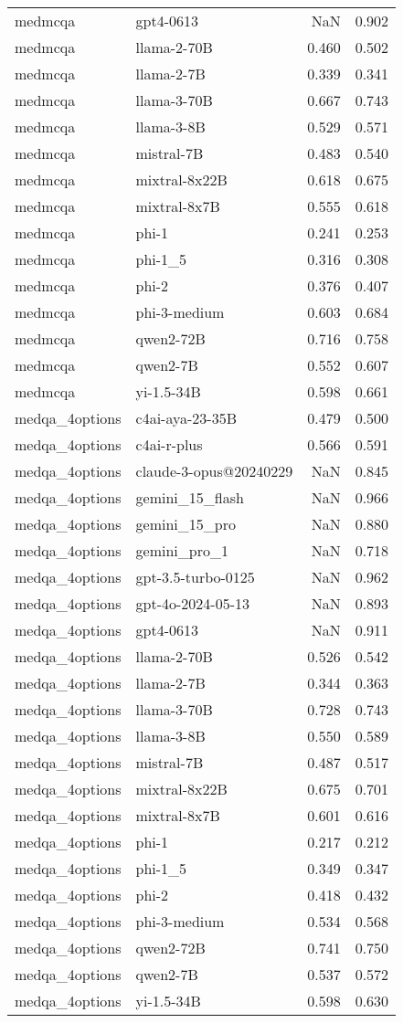 \begin{tabular}{llrr}
medmcqa & gpt4-0613 & NaN & 0.902 \\
medmcqa & llama-2-70B & 0.460 & 0.502 \\
medmcqa & llama-2-7B & 0.339 & 0.341 \\
medmcqa & llama-3-70B & 0.667 & 0.743 \\
medmcqa & llama-3-8B & 0.529 & 0.571 \\
medmcqa & mistral-7B & 0.483 & 0.540 \\
medmcqa & mixtral-8x22B & 0.618 & 0.675 \\
medmcqa & mixtral-8x7B & 0.555 & 0.618 \\
medmcqa & phi-1 & 0.241 & 0.253 \\
medmcqa & phi-1_5 & 0.316 & 0.308 \\
medmcqa & phi-2 & 0.376 & 0.407 \\
medmcqa & phi-3-medium & 0.603 & 0.684 \\
medmcqa & qwen2-72B & 0.716 & 0.758 \\
medmcqa & qwen2-7B & 0.552 & 0.607 \\
medmcqa & yi-1.5-34B & 0.598 & 0.661 \\
medqa_4options & c4ai-aya-23-35B & 0.479 & 0.500 \\
medqa_4options & c4ai-r-plus & 0.566 & 0.591 \\
medqa_4options & claude-3-opus@20240229 & NaN & 0.845 \\
medqa_4options & gemini_15_flash & NaN & 0.966 \\
medqa_4options & gemini_15_pro & NaN & 0.880 \\
medqa_4options & gemini_pro_1 & NaN & 0.718 \\
medqa_4options & gpt-3.5-turbo-0125 & NaN & 0.962 \\
medqa_4options & gpt-4o-2024-05-13 & NaN & 0.893 \\
medqa_4options & gpt4-0613 & NaN & 0.911 \\
medqa_4options & llama-2-70B & 0.526 & 0.542 \\
medqa_4options & llama-2-7B & 0.344 & 0.363 \\
medqa_4options & llama-3-70B & 0.728 & 0.743 \\
medqa_4options & llama-3-8B & 0.550 & 0.589 \\
medqa_4options & mistral-7B & 0.487 & 0.517 \\
medqa_4options & mixtral-8x22B & 0.675 & 0.701 \\
medqa_4options & mixtral-8x7B & 0.601 & 0.616 \\
medqa_4options & phi-1 & 0.217 & 0.212 \\
medqa_4options & phi-1_5 & 0.349 & 0.347 \\
medqa_4options & phi-2 & 0.418 & 0.432 \\
medqa_4options & phi-3-medium & 0.534 & 0.568 \\
medqa_4options & qwen2-72B & 0.741 & 0.750 \\
medqa_4options & qwen2-7B & 0.537 & 0.572 \\
medqa_4options & yi-1.5-34B & 0.598 & 0.630 \\
\bottomrule
\end{tabular}
